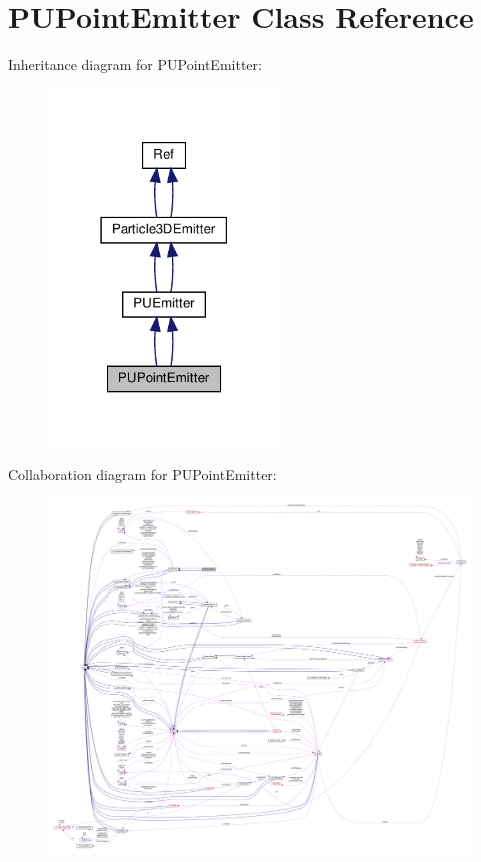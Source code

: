 \hypertarget{classPUPointEmitter}{}\section{P\+U\+Point\+Emitter Class Reference}
\label{classPUPointEmitter}


Inheritance diagram for P\+U\+Point\+Emitter\+:
\nopagebreak
\begin{figure}[H]
\begin{center}
\leavevmode
\includegraphics[width=174pt]{classPUPointEmitter__inherit__graph}
\end{center}
\end{figure}


Collaboration diagram for P\+U\+Point\+Emitter\+:
\nopagebreak
\begin{figure}[H]
\begin{center}
\leavevmode
\includegraphics[width=350pt]{classPUPointEmitter__coll__graph}
\end{center}
\end{figure}
